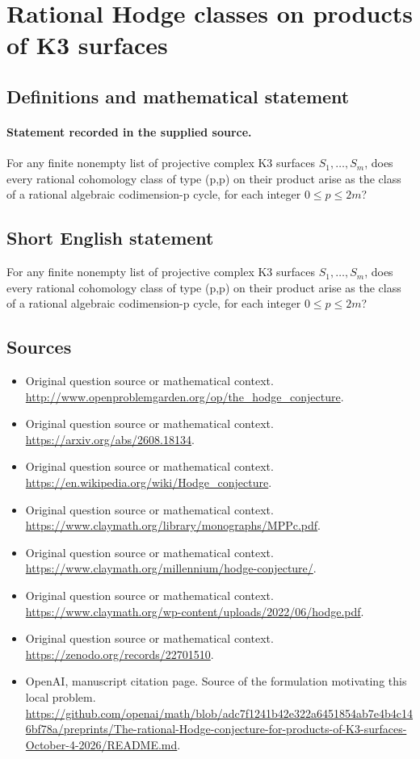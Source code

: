 \documentclass[11pt]{article}
\begin{document}
\section*{Rational Hodge classes on products of K3 surfaces}\label{statement}
\subsection{Definitions and mathematical statement}
\paragraph{Statement recorded in the supplied source.}
For any finite nonempty list of projective complex K3 surfaces $S_{1},\dots ,S_m$, does every rational cohomology class of type (p,p) on their product arise as the class of a rational algebraic codimension-p cycle, for each integer $0\leq p\leq 2m$?
\subsection{Short English statement}
For any finite nonempty list of projective complex K3 surfaces $S_{1},\dots ,S_m$, does every rational cohomology class of type (p,p) on their product arise as the class of a rational algebraic codimension-p cycle, for each integer $0\leq p\leq 2m$?
\subsection{Sources}
\begin{itemize}
\item[S1] Original question source or mathematical context.
\url{http://www.openproblemgarden.org/op/the_hodge_conjecture}.
\item[S2] Original question source or mathematical context.
\url{https://arxiv.org/abs/2608.18134}.
\item[S3] Original question source or mathematical context.
\url{https://en.wikipedia.org/wiki/Hodge_conjecture}.
\item[S4] Original question source or mathematical context.
\url{https://www.claymath.org/library/monographs/MPPc.pdf}.
\item[S5] Original question source or mathematical context.
\url{https://www.claymath.org/millennium/hodge-conjecture/}.
\item[S6] Original question source or mathematical context.
\url{https://www.claymath.org/wp-content/uploads/2022/06/hodge.pdf}.
\item[S7] Original question source or mathematical context.
\url{https://zenodo.org/records/22701510}.
\item[S8] OpenAI, manuscript citation page. Source of the formulation motivating this local problem.
\url{https://github.com/openai/math/blob/adc7f1241b42e322a6451854ab7e4b4c146bf78a/preprints/The-rational-Hodge-conjecture-for-products-of-K3-surfaces-October-4-2026/README.md}.
\end{itemize}
\end{document}
